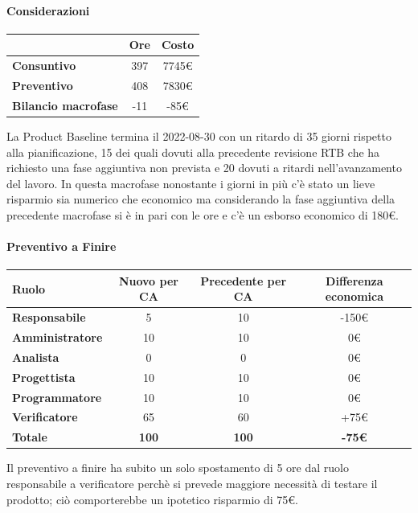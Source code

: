 \paragraph{Considerazioni} \hfill \break
\begin{center}
	\renewcommand{\arraystretch}{1.8}
	\begin{tabular}{ | l |c|c| }
    \hline
    & \textbf{Ore} & \textbf{Costo} \\
	\hline
    \textbf{Consuntivo} & 397 & 7745\euro \\
    \hline
    \textbf{Preventivo} & 408 & 7830\euro \\
    \hline
    \textbf{Bilancio macrofase} & -11 & -85\euro \\
    \hline
    \end{tabular}
\end{center}
La Product Baseline termina il 2022-08-30 con un ritardo di 35 giorni rispetto alla pianificazione, 15 dei quali dovuti alla precedente revisione RTB che ha richiesto una fase aggiuntiva non prevista e 20 dovuti a ritardi nell'avanzamento del lavoro. 
In questa macrofase nonostante i giorni in più c'è stato un lieve risparmio sia numerico che economico ma considerando la fase aggiuntiva della precedente macrofase si è in pari con le ore e c'è un esborso economico di 180\euro.

\newpage
\paragraph{Preventivo a Finire} \hfill \break

\begin{center}
	\renewcommand{\arraystretch}{1.8}
	\begin{tabular}{ | l |c|c|c| }
    \hline
    \textbf{Ruolo} & \textbf{Nuovo per CA} & \textbf{Precedente per CA}  & \textbf{Differenza economica}\\
	\hline
    \textbf{Responsabile} & 5 & 10 & -150\euro \\
    \hline
    \textbf{Amministratore} & 10 & 10 & 0\euro \\
    \hline
    \textbf{Analista} & 0 & 0 & 0\euro \\
    \hline
    \textbf{Progettista} & 10 & 10 & 0\euro \\
    \hline
    \textbf{Programmatore} & 10 & 10 & 0\euro \\
    \hline
    \textbf{Verificatore} & 65 & 60 & +75\euro \\
    \hline
    \textbf{Totale} & \textbf{100} & \textbf{100} & \textbf{-75\euro} \\
    \hline
    \end{tabular}
\end{center}
Il preventivo a finire ha subito un solo spostamento di 5 ore dal ruolo responsabile a verificatore perchè si prevede maggiore necessità di testare il prodotto; ciò comporterebbe un ipotetico risparmio di 75\euro.